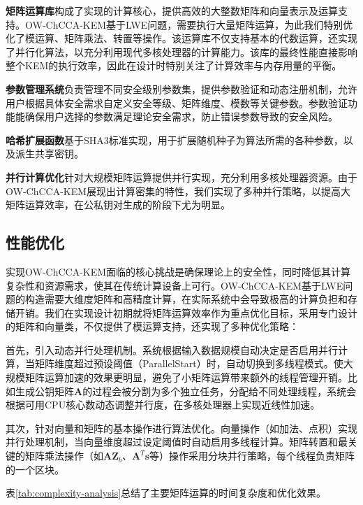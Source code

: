 \textbf{矩阵运算库}构成了实现的计算核心，提供高效的大整数矩阵和向量表示及运算支持。OW-ChCCA-KEM基于LWE问题，需要执行大量矩阵运算，为此我们特别优化了模运算、矩阵乘法、转置等操作。该运算库不仅支持基本的代数运算，还实现了并行化算法，以充分利用现代多核处理器的计算能力。该库的最终性能直接影响整个KEM的执行效率，因此在设计时特别关注了计算效率与内存用量的平衡。

\textbf{参数管理系统}负责管理不同安全级别参数集，提供参数验证和动态注册机制，允许用户根据具体安全需求自定义安全等级、矩阵维度、模数等关键参数。参数验证功能能确保用户选择的参数满足理论安全需求，防止错误参数导致的安全风险。

\textbf{哈希扩展函数}基于SHA3标准实现，用于扩展随机种子为算法所需的各种参数，以及派生共享密钥。

\textbf{并行计算优化}针对大规模矩阵运算提供并行实现，充分利用多核处理器资源。由于OW-ChCCA-KEM展现出计算密集的特性，我们实现了多种并行策略，以提高大矩阵运算效率，在公私钥对生成的阶段下尤为明显。



\subsection{性能优化}

实现OW-ChCCA-KEM面临的核心挑战是确保理论上的安全性，同时降低其计算复杂性和资源需求，使其在传统计算设备上可行。OW-ChCCA-KEM基于LWE问题的构造需要大维度矩阵和高精度计算，在实际系统中会导致极高的计算负担和存储开销。我们在实现设计初期就将矩阵运算效率作为重点优化目标，采用专门设计的矩阵和向量类，不仅提供了模运算支持，还实现了多种优化策略：

首先，引入动态并行处理机制。系统根据输入数据规模自动决定是否启用并行计算，当矩阵维度超过预设阈值（ParallelStart）时，自动切换到多线程模式。使大规模矩阵运算加速的效果更明显，避免了小矩阵运算带来额外的线程管理开销。比如生成公钥矩阵$\mathbf{A}$的过程会被分割为多个独立任务，分配给不同处理线程，系统会根据可用CPU核心数动态调整并行度，在多核处理器上实现近线性加速。

其次，针对向量和矩阵的基本操作进行算法优化。向量操作（如加法、点积）实现并行处理机制，当向量维度超过设定阈值时自动启用多线程计算。矩阵转置和最关键的矩阵乘法操作（如$\mathbf{A}\mathbf{Z}_b$、$\mathbf{A}^T\mathbf{s}$等）操作采用分块并行策略，每个线程负责矩阵的一个区块。

表\ref{tab:complexity-analysis}总结了主要矩阵运算的时间复杂度和优化效果。


